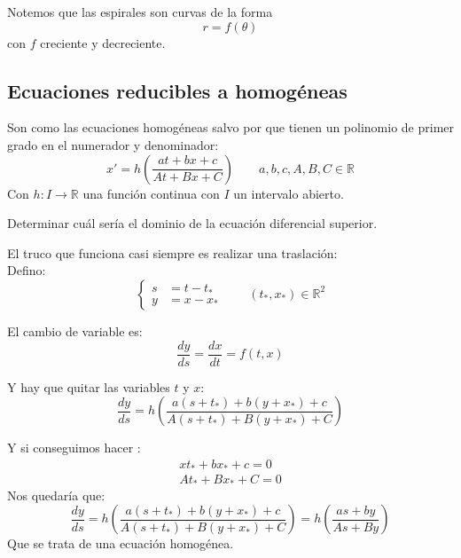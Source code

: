 \begin{ejemplo}
Notemos que las espirales son curvas de la forma
\begin{equation*}
    r = f(\theta)
\end{equation*}
con $f$ creciente y decreciente.
\end{ejemplo}

\subsection{Ecuaciones reducibles a homogéneas}
Son como las ecuaciones homogéneas salvo por que tienen un polinomio de primer grado en el numerador y denominador:
\begin{equation*}
    x' = h\left(\dfrac{at + bx + c}{At + Bx + C}\right) \qquad a,b,c,A,B,C \in \mathbb{R}
\end{equation*}
Con $h:I\rightarrow\mathbb{R}$ una función continua con $I$ un intervalo abierto.

\begin{ejercicio}
    Determinar cuál sería el dominio de la ecuación diferencial superior.
\end{ejercicio}

El truco que funciona casi siempre es realizar una traslación:\\

Defino:
\begin{equation*}
    \left\{\begin{array}{rl}
            s &= t - t_* \\
            y &= x - x_*
    \end{array}\right. \qquad (t_*, x_*)\in \mathbb{R}^2
\end{equation*}

El cambio de variable es:
\begin{equation*}
    \dfrac{dy}{ds} = \dfrac{dx}{dt} = f(t,x)
\end{equation*}

Y hay que quitar las variables $t$ y $x$:
\begin{equation*}
    \dfrac{dy}{ds} = h\left(\dfrac{a(s+t_*)+b(y+x_*)+c}{A(s+t_*)+B(y+x_*)+C}\right)
\end{equation*}

Y si conseguimos hacer :
\begin{gather*}
    xt_* + bx_* + c = 0 \\
    At_* + Bx_* + C = 0
\end{gather*}
Nos quedaría que:
\begin{equation*}
    \dfrac{dy}{ds} = h\left(\dfrac{a(s+t_*)+b(y+x_*)+c}{A(s+t_*)+B(y+x_*)+C}\right) = h\left(\dfrac{as + by}{As+By}\right)
\end{equation*}
Que se trata de una ecuación homogénea.\\

